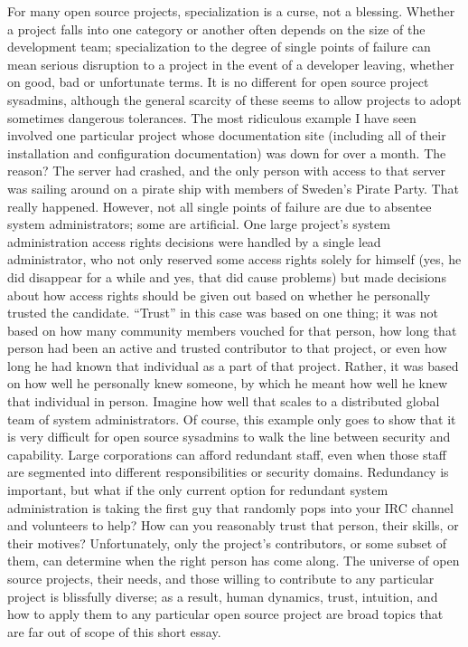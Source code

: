 For many open source projects, specialization is a curse, not a blessing.
Whether a project falls into one category or another often depends on the size
of the development team; specialization to the degree of single points of
failure can mean serious disruption to a project in the event of a developer
leaving, whether on good, bad or unfortunate terms. It is no different for open
source project sysadmins, although the general scarcity of these seems to allow
projects to adopt sometimes dangerous tolerances.
The most ridiculous example I have seen involved one particular project whose
documentation site (including all of their installation and configuration
documentation) was down for over a month. The reason? The server had crashed,
and the only person with access to that server was sailing around on a pirate
ship with members of Sweden’s Pirate Party. That really happened.
However, not all single points of failure are due to absentee system
administrators; some are artificial. One large project’s system administration
access rights decisions were handled by a single lead administrator, who not
only reserved some access rights solely for himself (yes, he did disappear for a
while and yes, that did cause problems) but made decisions about how access
rights should be given out based on whether he personally trusted the candidate.
``Trust'' in this case was based on one thing; it was not based on how many
community members vouched for that person, how long that person had been an
active and trusted contributor to that project, or even how long he had known
that individual as a part of that project. Rather, it was based on how well he
personally knew someone, by which he meant how well he knew that individual in
person. Imagine how well that scales to a distributed global team of system
administrators.
Of course, this example only goes to show that it is very difficult for open
source sysadmins to walk the line between security and capability. Large
corporations can afford redundant staff, even when those staff are segmented
into different responsibilities or security domains. Redundancy is important,
but what if the only current option for redundant system administration is
taking the first guy that randomly pops into your IRC channel and volunteers to
help? How can you reasonably trust that person, their skills, or their motives?
Unfortunately, only the project’s contributors, or some subset of them, can
determine when the right person has come along. The universe of open source
projects, their needs, and those willing to contribute to any particular project
is blissfully diverse; as a result, human dynamics, trust, intuition, and how to
apply them to any particular open source project are broad topics that are far
out of scope of this short essay.

